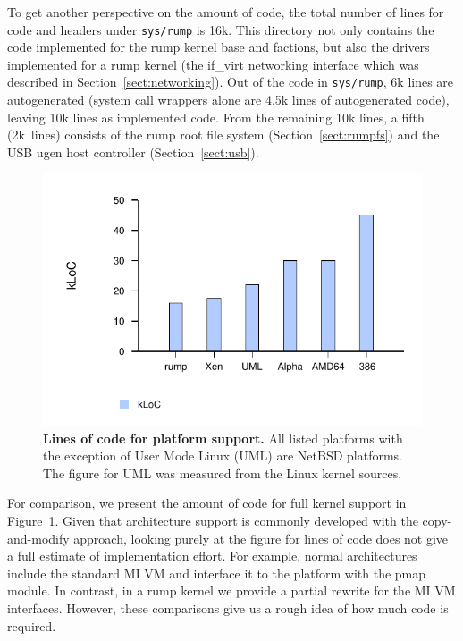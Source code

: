 To get another perspective on the amount of code, the total number
of lines for code and headers under \texttt{sys/rump} is 16k.
This directory not only contains the code implemented for the rump
kernel base and factions, but also the drivers implemented for a rump
kernel (\eg the if\_virt networking interface which was described in
Section~\ref{sect:networking}).  Out of the code in \texttt{sys/rump},
6k lines are autogenerated (system call wrappers alone are 4.5k lines of
autogenerated code), leaving 10k lines as implemented code.  From the
remaining 10k lines, a fifth (2k~lines) consists of the rump root file
system (Section~\ref{sect:rumpfs}) and the USB ugen host controller
(Section~\ref{sect:usb}).

\begin{figure}[t]
\includegraphics{archlines}
\caption[Lines of code for platform support]{
\textbf{Lines of code for platform support.}
All listed platforms with the exception of User Mode Linux (UML)
are NetBSD platforms.  The figure for UML was measured from the Linux
kernel sources.
}
\label{fig:archloc}
\end{figure}

For comparison, we present the amount of code for full kernel support
in Figure~\ref{fig:archloc}.  Given that architecture support is
commonly developed with the copy-and-modify approach, looking purely
at the figure for lines of code does not give a full estimate of
implementation effort.  For example, normal architectures include
the standard MI VM and interface it to the platform with the pmap
module.  In contrast, in a rump kernel we provide a partial rewrite
for the MI VM interfaces.  However, these comparisons give us a
rough idea of how much code is required.

